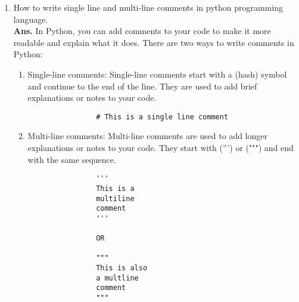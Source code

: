 \documentclass{article}
\begin{document}
\begin{enumerate}
\begin{lstlisting}[language=python, caption=Basic Syntax of Print function]
	\end{lstlisting}
	\item How to write single line and multi-line comments in python programming language.\\
	\textbf{Ans.} In Python, you can add comments to your code to make it more readable and explain what it does. There are two ways to write comments in Python:
		\begin{enumerate}
			\item Single-line comments: Single-line comments start with a (hash) symbol and continue to the end of the line. They are used to add brief explanations or notes to your code.
			\begin{lstlisting}
				# This is a single line comment
			\end{lstlisting}
			\item Multi-line comments: Multi-line comments are used to add longer explanations or notes to your code. They start with (''') or (""") and end with the same sequence.
			\begin{lstlisting}
				'''
				This is a 
				multiline 
				comment
				'''
				
				OR 
				
				"""
				This is also 
				a multline 
				comment
				"""
			\end{lstlisting}
		\end{enumerate}
\end{enumerate}
\end{document}
